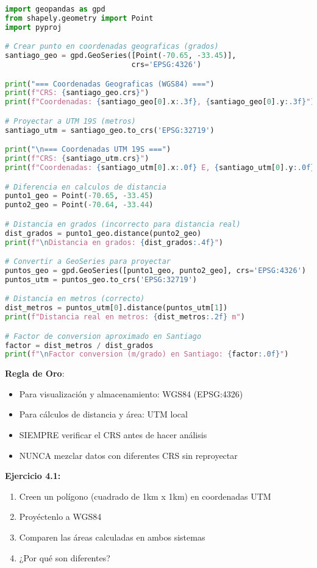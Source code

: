 \documentclass[11pt,a4paper]{article}
\newcommand{\importante}[1]{\begin{tcolorbox}[colback=yellow!10,colframe=orange,title={Importante}]#1\end{tcolorbox}}
\newcommand{\ejercicio}[1]{\begin{tcolorbox}[colback=red!5,colframe=red,title={Ejercicio}]#1\end{tcolorbox}}
\begin{document}
\begin{lstlisting}[language=Python]
import geopandas as gpd
from shapely.geometry import Point
import pyproj

# Crear punto en coordenadas geograficas (grados)
santiago_geo = gpd.GeoSeries([Point(-70.65, -33.45)], 
                             crs='EPSG:4326')

print("=== Coordenadas Geograficas (WGS84) ===")
print(f"CRS: {santiago_geo.crs}")
print(f"Coordenadas: {santiago_geo[0].x:.3f}, {santiago_geo[0].y:.3f}")

# Proyectar a UTM 19S (metros)
santiago_utm = santiago_geo.to_crs('EPSG:32719')

print("\n=== Coordenadas UTM 19S ===")
print(f"CRS: {santiago_utm.crs}")
print(f"Coordenadas: {santiago_utm[0].x:.0f} E, {santiago_utm[0].y:.0f} N")

# Diferencia en calculos de distancia
punto1_geo = Point(-70.65, -33.45)
punto2_geo = Point(-70.64, -33.44)

# Distancia en grados (incorrecto para distancia real)
dist_grados = punto1_geo.distance(punto2_geo)
print(f"\nDistancia en grados: {dist_grados:.4f}")

# Convertir a GeoSeries para proyectar
puntos_geo = gpd.GeoSeries([punto1_geo, punto2_geo], crs='EPSG:4326')
puntos_utm = puntos_geo.to_crs('EPSG:32719')

# Distancia en metros (correcto)
dist_metros = puntos_utm[0].distance(puntos_utm[1])
print(f"Distancia real en metros: {dist_metros:.2f} m")

# Factor de conversion aproximado en Santiago
factor = dist_metros / dist_grados
print(f"\nFactor conversion (m/grado) en Santiago: {factor:.0f}")
\end{lstlisting}

\importante{
\textbf{Regla de Oro}: 
\begin{itemize}
    \item Para visualización y almacenamiento: WGS84 (EPSG:4326)
    \item Para cálculos de distancia y área: UTM local
    \item SIEMPRE verificar el CRS antes de hacer análisis
    \item NUNCA mezclar datos con diferentes CRS sin reproyectar
\end{itemize}
}

\ejercicio{
\textbf{Ejercicio 4.1:} 
\begin{enumerate}
    \item Creen un polígono (cuadrado de 1km x 1km) en coordenadas UTM
    \item Proyéctenlo a WGS84
    \item Comparen las áreas calculadas en ambos sistemas
    \item ¿Por qué son diferentes?
\end{enumerate}
}
\end{document}
